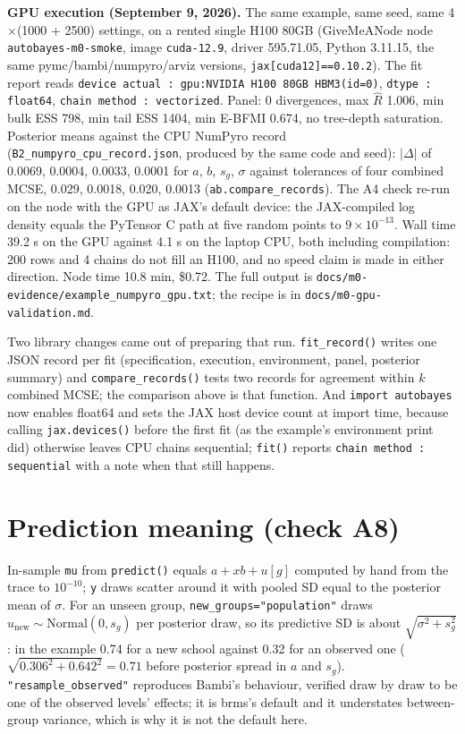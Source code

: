 \documentclass[11pt]{article}
\newcommand{\code}[1]{\texttt{#1}}
\newcommand{\file}[1]{\texttt{#1}}
\begin{document}
\medskip
\textbf{GPU execution (September 9, 2026).} The same example, same seed, same
4$\times$(1000 + 2500) settings, on a rented single H100 80GB (GiveMeANode node
\code{autobayes-m0-smoke}, image \code{cuda-12.9}, driver 595.71.05, Python 3.11.15, the
same pymc/bambi/numpyro/arviz versions, \code{jax[cuda12]==0.10.2}). The fit report reads
\code{device actual : gpu:NVIDIA H100 80GB HBM3(id=0)}, \code{dtype : float64},
\code{chain method : vectorized}. Panel: 0 divergences, max $\hat R$ 1.006, min bulk ESS 798,
min tail ESS 1404, min E-BFMI 0.674, no tree-depth saturation. Posterior means against the CPU
NumPyro record (\file{B2\_numpyro\_cpu\_record.json}, produced by the same code and seed):
$|\Delta|$ of 0.0069, 0.0004, 0.0033, 0.0001 for $a$, $b$, $s_g$, $\sigma$ against tolerances
of four combined MCSE, 0.029, 0.0018, 0.020, 0.0013 (\code{ab.compare\_records}). The A4
check re-run on the node with the GPU as JAX's default device: the JAX-compiled log density
equals the PyTensor C path at five random points to $9\times10^{-13}$. Wall time 39.2 s on
the GPU against 4.1 s on the laptop CPU, both including compilation: 200 rows and 4 chains do
not fill an H100, and no speed claim is made in either direction. Node time 10.8 min, \$0.72.
The full output is \file{docs/m0-evidence/example\_numpyro\_gpu.txt}; the recipe is in
\file{docs/m0-gpu-validation.md}.

Two library changes came out of preparing that run. \code{fit\_record()} writes one
JSON record per fit (specification, execution, environment, panel, posterior summary) and
\code{compare\_records()} tests two records for agreement within $k$ combined MCSE; the
comparison above is that function. And \code{import autobayes} now enables float64 and sets
the JAX host device count at import time, because calling \code{jax.devices()} before the
first fit (as the example's environment print did) otherwise leaves CPU chains sequential;
\code{fit()} reports \code{chain method : sequential} with a note when that still happens.

\section{Prediction meaning (check A8)}

In-sample \code{mu} from \code{predict()} equals $a + x b + u[g]$ computed by hand from
the trace to $10^{-10}$; \code{y} draws scatter around it with pooled SD equal to the
posterior mean of $\sigma$. For an unseen group, \code{new\_groups="population"} draws
$u_\text{new} \sim \mathrm{Normal}(0, s_g)$ per posterior draw, so its predictive SD is
about $\sqrt{\sigma^2 + s_g^2}$: in the example 0.74 for a new school against 0.32 for an
observed one ($\sqrt{0.306^2 + 0.642^2} = 0.71$ before posterior spread in $a$ and $s_g$).
\code{"resample\_observed"} reproduces Bambi's behaviour, verified draw by draw to be one of
the observed levels' effects; it is brms's default and it understates between-group
variance, which is why it is not the default here.
\end{document}
